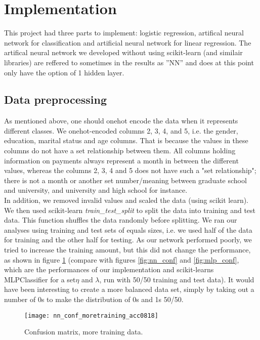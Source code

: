 \documentclass[11pt,english, A4]{article}
\begin{document}
\section{Implementation}

This project had three parts to implement: logistic regression, artifical neural network for classification and artificial neural network for linear regression. The artifical neural network we developed without using scikit-learn (and similair libraries) are reffered to sometimes in the results as ''NN'' and does at this point only have the option of 1 hidden layer.

\subsection{Data preprocessing}
As mentioned above, one should onehot encode the data when it represents different classes. 
We onehot-encoded columns 2, 3, 4, and 5, i.e. the gender, education, marital status and age columns. That is because the values in these columns do not have a set relationship between them. All columns holding information on payments always represent a month in between the different values, whereas the columns 2, 3, 4 and 5 does not have such a "set relationship"; there is not a month or another set number/meaning between graduate school and university, and university and high school for instance. \\

In addition, we removed invalid values and scaled the data (using scikit learn). We then used scikit-learn \textit{train\_test\_split} to split the data into training and test data. This function shuffles the data randomly before splitting. We ran our analyses using training and test sets of equals sizes, i.e. we used half of the data for training and the other half for testing. As our network performed poorly, we tried to increase the training amount, but this did not change the performance, as shown in figure \ref{fig:nn_conf_moretraining_acc0818} (compare with figures \ref{fig:nn_conf} and \ref{fig:mlp_conf}, which are the performances of our implementation and scikit-learns MLPClassifier for a set$\eta$ and $\lambda$, run with 50/50 training and test data). It would have been interesting to create a more balanced data set, simply by taking out a number of 0s to make the distribution of 0s and 1s 50/50.

\begin{figure}[H]
\begin{center}
  \texttt{[image: nn\_conf\_moretraining\_acc0818]}
  \caption{Confusion matrix, more training data.}
  \label{fig:nn_conf_moretraining_acc0818}
  \end{center}
\end{figure}
\end{document}
